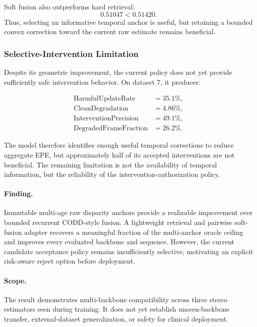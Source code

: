 \documentclass[11pt,a4paper]{article}
\begin{document}
Soft fusion also outperforms hard retrieval:
\begin{equation}
    0.51047 < 0.51420.
\end{equation}
Thus, selecting an informative temporal anchor is useful, but retaining a bounded convex
correction toward the current raw estimate remains beneficial.

\subsubsection{Selective-Intervention Limitation}

Despite its geometric improvement, the current policy does not yet provide sufficiently
safe intervention behavior. On dataset 7, it produces:

\begin{align}
    \operatorname{HarmfulUpdateRate}
    &= 35.1\%,\\
    \operatorname{CleanDegradation}
    &= 4.86\%,\\
    \operatorname{InterventionPrecision}
    &= 49.1\%,\\
    \operatorname{DegradedFrameFraction}
    &= 26.2\%.
\end{align}

The model therefore identifies enough useful temporal corrections to reduce aggregate
EPE, but approximately half of its accepted interventions are not beneficial. The
remaining limitation is not the availability of temporal information, but the reliability
of the intervention-authorization policy.

\paragraph{Finding.}

Immutable multi-age raw disparity anchors provide a realizable improvement over bounded
recurrent CODD-style fusion. A lightweight retrieval and pairwise soft-fusion adapter
recovers a meaningful fraction of the multi-anchor oracle ceiling and improves every
evaluated backbone and sequence. However, the current candidate acceptance policy remains
insufficiently selective, motivating an explicit risk-aware reject option before deployment.

\paragraph{Scope.}

The result demonstrates multi-backbone compatibility across three stereo estimators seen
during training. It does not yet establish unseen-backbone transfer, external-dataset
generalization, or safety for clinical deployment.
\end{document}
